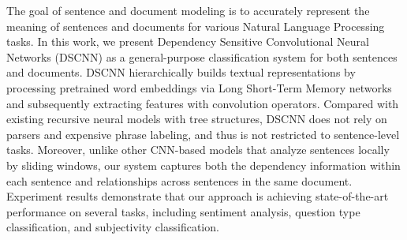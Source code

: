 The goal of sentence and document modeling is to accurately represent the meaning of sentences and documents for various Natural Language Processing tasks. In this work, we present Dependency Sensitive Convolutional Neural Networks (DSCNN) as a general-purpose classification system for both sentences and documents. DSCNN hierarchically builds textual representations by processing pretrained word embeddings via Long Short-Term Memory networks and subsequently extracting features with convolution operators. Compared with existing recursive neural models with tree structures, DSCNN does not rely on parsers and expensive phrase labeling, and thus is not restricted to sentence-level tasks. Moreover, unlike other CNN-based models that analyze sentences locally by sliding windows, our system captures both the dependency information within each sentence and relationships across sentences in the same document. Experiment results demonstrate that our approach is achieving state-of-the-art performance on several tasks, including sentiment analysis, question type classification, and subjectivity classification.

